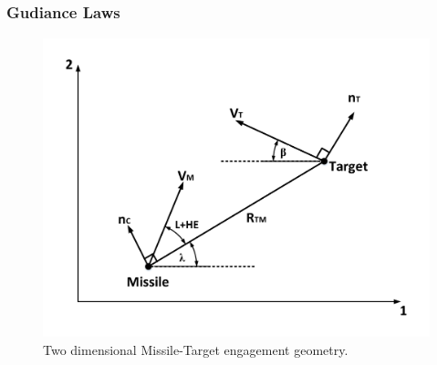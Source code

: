 \documentclass{beamer}
\begin{document}
\subsection{} 
\begin{frame}
\frametitle{Gudiance Laws}
\begin{figure}[htb]
	\centering
	\includegraphics[scale = 0.3]{fig/PN.pdf}
	\caption{Two dimensional Missile-Target engagement geometry.}
	\label{PN}
\end{figure}
\end{frame}
\end{document}
